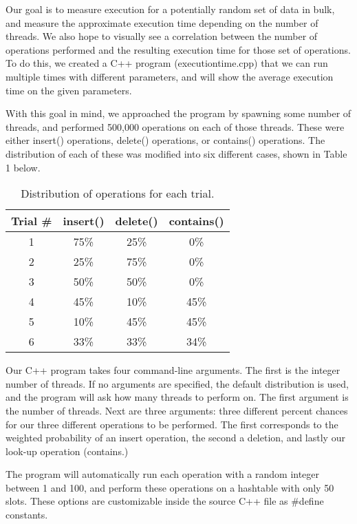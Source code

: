 \documentclass[journal]{IEEEtran}
\begin{document}
Our goal is to measure execution for a potentially random set of data in bulk, and measure the approximate execution time depending on the number of threads. We also hope to visually see a correlation between the number of operations performed and the resulting execution time for those set of operations. To do this, we created a C++ program (executiontime.cpp) that we can run multiple times with different parameters, and will show the average execution time on the given parameters.

With this goal in mind, we approached the program by spawning some number of threads, and performed 500,000 operations on each of those threads. These were either insert() operations, delete() operations, or contains() operations. The distribution of each of these was modified into six different cases, shown in Table 1 below.

\begin{table}[h]
\centering
\begin{center}
\begin{tabular}{ |c|c|c|c| } 
 \hline
 Trial \# & insert() & delete() & contains() \\ 
 \hline
 1 & 75\% & 25\% & 0\% \\ 
 2 & 25\% & 75\% & 0\% \\ 
 3 & 50\% & 50\% & 0\% \\ 
 4 & 45\% & 10\% & 45\% \\ 
 5 & 10\% & 45\% & 45\% \\ 
 6 & 33\% & 33\% & 34\% \\ 
 \hline
\end{tabular}
\end{center}
\caption{Distribution of operations for each trial.}
\end{table}


Our C++ program takes four command-line arguments. The first is the integer number of threads. If no arguments are specified, the default distribution is used, and the program will ask how many threads to perform on. The first argument is the number of threads. Next are three arguments: three different percent chances for our three different operations to be performed. The first corresponds to the weighted probability of an insert operation, the second a deletion, and lastly our look-up operation (contains.)

The program will automatically run each operation with a random integer between 1 and 100, and perform these operations on a hashtable with only 50 slots. These options are customizable inside the source C++ file as \#define constants.
\end{document}
